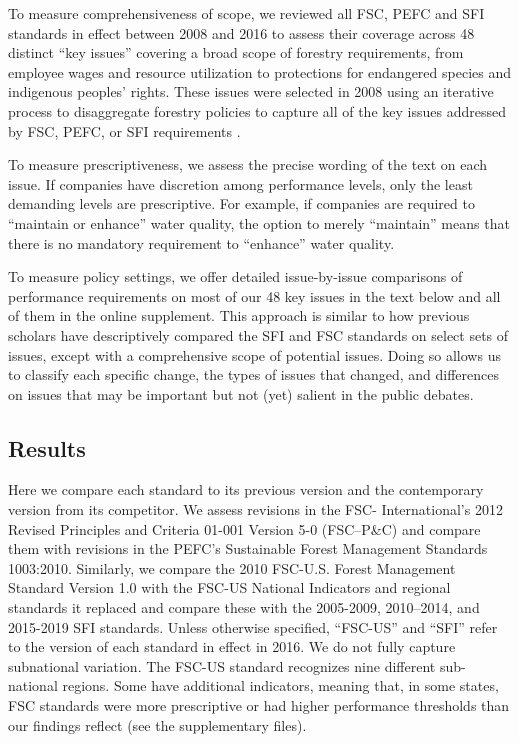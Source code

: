 \documentclass[
      12pt,
            Review ]{article}
\begin{document}
To measure comprehensiveness of scope, we reviewed all FSC, PEFC and SFI standards in effect between 2008 and 2016 to assess their coverage across 48 distinct ``key issues'' covering a broad scope of forestry requirements, from employee wages and resource utilization to protections for endangered species and indigenous peoples' rights. These issues were selected in 2008 using an iterative process to disaggregate forestry policies to capture all of the key issues addressed by FSC, PEFC, or SFI requirements \citep{McDermott2010}.

To measure prescriptiveness, we assess the precise wording of the text on each issue. If companies have discretion among performance levels, only the least demanding levels are prescriptive. For example, if companies are required to ``maintain or enhance'' water quality, the option to merely ``maintain'' means that there is no mandatory requirement to ``enhance'' water quality.

To measure policy settings, we offer detailed issue-by-issue comparisons of performance requirements on most of our 48 key issues in the text below and all of them in the online supplement. This approach is similar to how previous scholars have descriptively compared the SFI and FSC standards on select sets of issues, except with a comprehensive scope of potential issues. Doing so allows us to classify each specific change, the types of issues that changed, and differences on issues that may be important but not (yet) salient in the public debates.

\hypertarget{results}{%
\subsection{Results}\label{results}}

Here we compare each standard to its previous version and the contemporary version from its competitor. We assess revisions in the FSC- International's 2012 Revised Principles and Criteria 01-001 Version 5-0 (FSC--P\&C) and compare them with revisions in the PEFC's Sustainable Forest Management Standards 1003:2010. Similarly, we compare the 2010 FSC-U.S. Forest Management Standard Version 1.0 with the FSC-US National Indicators and regional standards it replaced and compare these with the 2005-2009, 2010--2014, and 2015-2019 SFI standards. Unless otherwise specified, ``FSC-US'' and ``SFI'' refer to the version of each standard in effect in 2016. We do not fully capture subnational variation. The FSC-US standard recognizes nine different sub-national regions. Some have additional indicators, meaning that, in some states, FSC standards were more prescriptive or had higher performance thresholds than our findings reflect (see the supplementary files).
\end{document}
